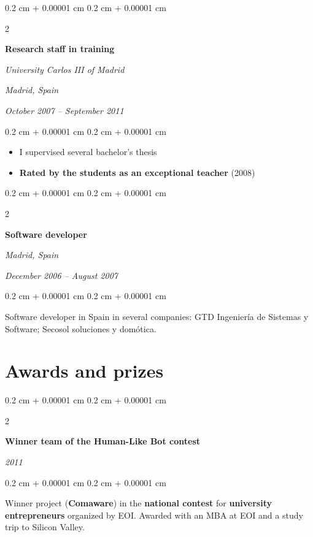 \documentclass[10pt, letterpaper]{article}
\newenvironment{highlights}{
	\begin{itemize}[
		topsep=0.10 cm,
		parsep=0.10 cm,
		partopsep=0pt,
		itemsep=0pt,
		leftmargin=0.4 cm + 10pt
	]
	}{
	\end{itemize}
} %
\newenvironment{onecolentry}{
	\begin{adjustwidth}{
		0.2 cm + 0.00001 cm
	}{
		0.2 cm + 0.00001 cm
	}
	}{
	\end{adjustwidth}
} %
\newenvironment{twocolentry}[2][]{
	\onecolentry
	\def\secondColumn{#2}
	\setcolumnwidth{\fill, 5.5 cm}
	\begin{paracol}{2}
	}{
		\switchcolumn \raggedleft \secondColumn
	\end{paracol}
	\endonecolentry
} %
\begin{document}
	\vspace{0.2 cm}

	\begin{twocolentry}{
		\textit{Madrid, Spain}
		
		\textit{October 2007 – September 2011}}
		\textbf{Research staff in training}
		
		\textit{University Carlos III of Madrid}
	\end{twocolentry}

	\vspace{0.10 cm}
	\begin{onecolentry}
		\begin{highlights}
			\item I supervised several bachelor's thesis
			\item \textbf{Rated by the students as an exceptional teacher} (2008)
		\end{highlights}
	\end{onecolentry}

	\vspace{0.2 cm}

	\begin{twocolentry}{
		\textit{Madrid, Spain}
		
		\textit{December 2006 – August 2007}}
		\textbf{Software developer}
	\end{twocolentry}

	\vspace{0.10 cm}
	\begin{onecolentry}
		Software developer in Spain in several companies: GTD Ingeniería de Sistemas y Software; Secosol soluciones y domótica.
	\end{onecolentry}


	\section{Awards and prizes}

	\begin{twocolentry}{
		\textit{2011}}
		\textbf{Winner team of the Human-Like Bot contest}
	\end{twocolentry}

	\vspace{0.10 cm}
	\begin{onecolentry}
		Winner project (\textbf{Comaware}) in the \textbf{national contest} for \textbf{university entrepreneurs} organized by EOI. Awarded with an MBA at EOI and a study trip to Silicon Valley.
	\end{onecolentry}
\end{document}
